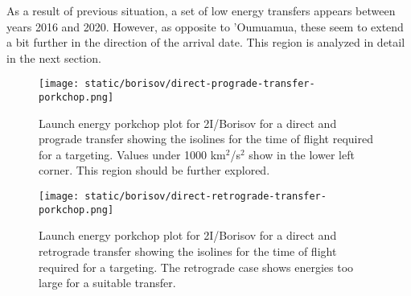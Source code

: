 As a result of previous situation, a set of low energy transfers appears between
years 2016 and 2020. However, as opposite to 'Oumuamua, these seem to extend a
bit further in the direction of the arrival date. This region is analyzed in
detail in the next section.

\begin{figure}[H]
  \centering
  \texttt{[image: static/borisov/direct-prograde-transfer-porkchop.png]}
  \caption[Direct and prograde launch energy porkchop for
    2I/Borisov]{Launch energy porkchop plot for 2I/Borisov for a direct and prograde
    transfer showing the isolines for
    the time of flight required for a targeting. Values under 1000
    km$^2$/s$^2$ show in the lower left corner. This region should be
    further explored.}
  \label{fig:borisov-direct-prograde-transfer-porkchop}
\end{figure}

\begin{figure}[H]
  \centering
  \texttt{[image: static/borisov/direct-retrograde-transfer-porkchop.png]}
  \caption[Direct and retrograde launch energy porkchop for
    2I/Borisov]{Launch energy porkchop plot for 2I/Borisov for a direct and
    retrograde transfer showing the isolines for
    the time of flight required for a targeting. The retrograde case shows
    energies too large for a suitable transfer.}
  \label{fig:borisov-direct-retrograde-transfer-porkchop}
\end{figure}

